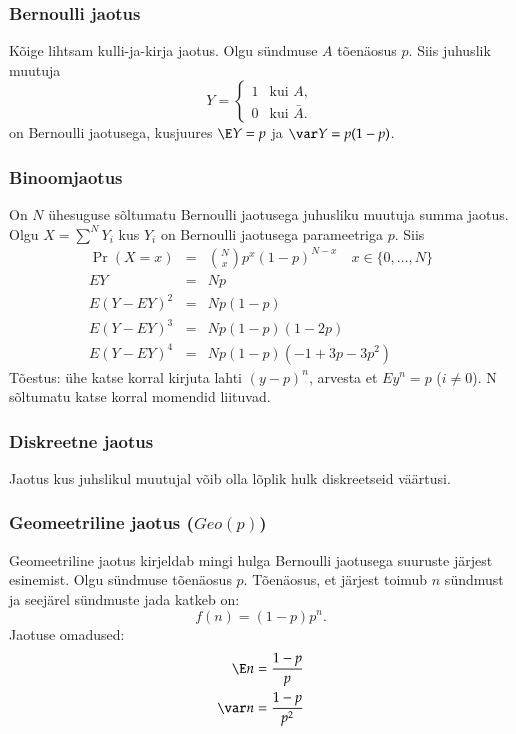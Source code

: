 \documentclass[a4paper]{article}
\numberwithin{equation}{subsection}
\begin{document}
\subsubsection{Bernoulli jaotus}
Kõige lihtsam kulli-ja-kirja jaotus.  Olgu sündmuse $A$ tõenäosus
$p$.  Siis juhuslik muutuja
\begin{equation}
  Y = 
  \begin{cases}
    1 & \text{kui $A$},\\
    0 & \text{kui $\bar A$.}
  \end{cases}
\end{equation}
on Bernoulli jaotusega, kusjuures $\E Y = p$ ja $\var Y = p(1-p)$.

\subsubsection{Binoomjaotus}
On $N$ ühesuguse sõltumatu Bernoulli jaotusega juhusliku muutuja summa
jaotus.  Olgu $X = \sum^N Y_i$ kus $Y_i$ on Bernoulli jaotusega
parameetriga $p$.  Siis
\begin{eqnarray}
\Pr(X = x) &=& \binom{N}{x} p^x (1-p)^{N-x} \quad x\in \{0, \ldots ,N\}\\
E Y &=& Np \\
E ( Y - EY)^2 &=& N p( 1 - p) \\
E ( Y - EY)^3 &=& N p( 1 - p)( 1 - 2p)\\
E ( Y - EY)^4 &=& N p( 1 - p)( -1 + 3p - 3p^2)
\end{eqnarray}
Tõestus: ühe katse korral kirjuta lahti $(y-p)^n$, arvesta et $Ey^n=p$
($i\not=0$).  N sõltumatu katse korral momendid liituvad.

\subsubsection{Diskreetne jaotus}
Jaotus kus juhslikul muutujal võib olla lõplik hulk diskreetseid
väärtusi. 

\subsubsection{Geomeetriline jaotus ($Geo(p)$)}
Geomeetriline jaotus kirjeldab mingi hulga Bernoulli jaotusega
suuruste järjest esinemist.  Olgu sündmuse tõenäosus $p$.  Tõenäosus,
et järjest toimub $n$ sündmust ja seejärel sündmuste jada katkeb on:
\begin{equation}
f(n) = (1-p)p^n.
\end{equation}
Jaotuse omadused:
\begin{eqnarray}
\E n = \frac{1-p}{p}\\
\var n = \frac{1-p}{p^2}
\end{eqnarray}
\end{document}
